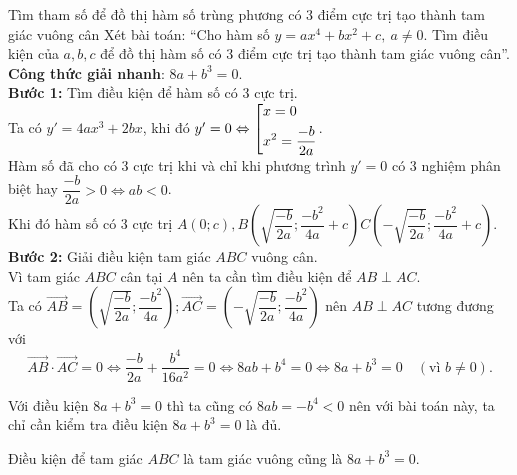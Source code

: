 \begin{dang}{Tìm tham số để đồ thị hàm số trùng phương có $3$ điểm cực trị tạo thành tam giác vuông cân}
	Xét bài toán: ``Cho hàm số $y=ax^4+bx^2+c,\ a\ne 0$. Tìm điều kiện của $a,b,c$ để đồ thị hàm số có $3$ điểm cực trị tạo thành tam giác vuông cân''.\\
	\textbf{Công thức giải nhanh}: $8a+b^3=0$.\\
	\textbf{Bước 1:} Tìm điều kiện để hàm số có $3$ cực trị.\\
	Ta có $y'=4ax^3+2bx$, khi đó $y'=0\Leftrightarrow \left[\begin{aligned}&x=0 \\ &x^2=\dfrac{-b}{2a}\end{aligned}\right.$.\\
	Hàm số đã cho có $3$ cực trị khi và chỉ khi phương trình $y'=0$ có $3$ nghiệm phân biệt hay $\dfrac{-b}{2a}>0\Leftrightarrow ab<0$.\\
	Khi đó hàm số có $3$ cực trị $A(0;c), B\left(\sqrt{\dfrac{-b}{2a}};\dfrac{-b^2}{4a}+c\right) C\left(-\sqrt{\dfrac{-b}{2a}};\dfrac{-b^2}{4a}+c\right)$.\\
	\textbf{Bước 2:} Giải điều kiện tam giác $ABC$ vuông cân.\\
	Vì tam giác $ABC$ cân tại $A$ nên ta cần tìm điều kiện để $AB\perp AC$.\\
	Ta có $\vec{AB}=\left(\sqrt{\dfrac{-b}{2a}};\dfrac{-b^2}{4a}\right); \vec{AC}=\left(-\sqrt{\dfrac{-b}{2a}};\dfrac{-b^2}{4a}\right)$ nên $AB\perp AC$ tương đương với\\
	$$\vec{AB}\cdot \vec{AC}=0\Leftrightarrow \dfrac{-b}{2a}+\dfrac{b^4}{16a^2}=0 \Leftrightarrow 8ab+b^4=0 \Leftrightarrow \boxed{8a+b^3=0}\quad(\text{vì }b\ne 0).$$
	\begin{note}
		Với điều kiện $8a+b^3=0$ thì ta cũng có $8ab=-b^4<0$ nên với bài toán này, ta chỉ cần kiểm tra điều kiện $8a+b^3=0$ là đủ.
	\end{note}
	\begin{note}
		Điều kiện để tam giác $ABC$ là tam giác vuông cũng là $8a+b^3=0$.
	\end{note}
\end{dang}
